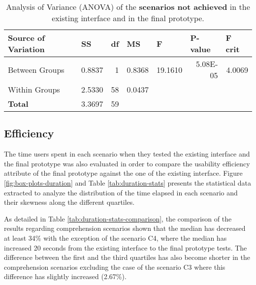 \begin{table}[tb]
  \caption{Analysis of Variance (ANOVA) of the \textbf{scenarios not achieved} in the existing interface and in the final prototype.}
	\label{tab:anova_not_achieved}
  \begin{tabular}{@{}lrrllll@{}}
  \toprule
  \textbf{Source of Variation} & \multicolumn{1}{l}{\textbf{SS}} & \multicolumn{1}{l}{\textbf{df}} & \textbf{MS}                & \textbf{F}                  & \textbf{P-value}             & \textbf{F crit}            \\ \midrule
  Between Groups               & 0.8837                          & 1                               & \multicolumn{1}{r}{0.8368} & \multicolumn{1}{r}{19.1610} & \multicolumn{1}{r}{5.08E-05} & \multicolumn{1}{r}{4.0069} \\
  Within Groups                & 2.5330                          & 58                              & \multicolumn{1}{r}{0.0437} &                             &                              &                            \\ \midrule
  \textbf{Total}               & 3.3697                          & 59                              &                            &                             &                              &                            \\ \bottomrule
  \end{tabular}
  \end{table}

\subsection{Efficiency}
\label{subsec:efficiency}
The time users spent in each scenario when they tested the existing interface and the final prototype was also evaluated in order to compare the usability efficiency attribute of the final prototype against the one of the existing interface. Figure \ref{fig:box-plots-duration} and Table \ref{tab:duration-stats} presents the statistical data extracted to analyze the distribution of the time elapsed in each scenario and their skewness along the different quartiles.

As detailed in Table \ref{tab:duration-stats-comparison}, the comparison of the results regarding comprehension scenarios shown that the median has decreased at least 34\% with the exception of the scenario C4, where the median has increased 20 seconds from the existing interface to the final prototype tests. The difference between the first and the third quartiles has also become shorter in the comprehension scenarios excluding the case of the scenario C3 where this difference has slightly increased (2.67\%). 

